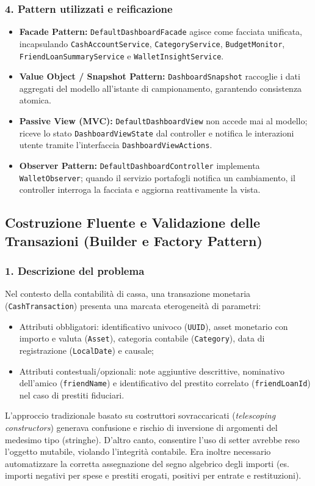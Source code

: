 \documentclass[11pt,a4paper,openright]{report}
\begin{document}
\subsubsection*{4. Pattern utilizzati e reificazione}
\begin{itemize}
  \item \textbf{Facade Pattern:} \texttt{DefaultDashboardFacade} agisce come facciata unificata, incapsulando \texttt{CashAccountService}, \texttt{CategoryService}, \texttt{BudgetMonitor}, \texttt{FriendLoanSummaryService} e \texttt{WalletInsightService}.
  \item \textbf{Value Object / Snapshot Pattern:} \texttt{DashboardSnapshot} raccoglie i dati aggregati del modello all'istante di campionamento, garantendo consistenza atomica.
  \item \textbf{Passive View (MVC):} \texttt{DefaultDashboardView} non accede mai al modello; riceve lo stato \texttt{DashboardViewState} dal controller e notifica le interazioni utente tramite l'interfaccia \texttt{DashboardViewActions}.
  \item \textbf{Observer Pattern:} \texttt{DefaultDashboardController} implementa \texttt{WalletObserver}; quando il servizio portafogli notifica un cambiamento, il controller interroga la facciata e aggiorna reattivamente la vista.
\end{itemize}

\subsection{Costruzione Fluente e Validazione delle Transazioni (Builder e Factory Pattern)}
\subsubsection*{1. Descrizione del problema}
Nel contesto della contabilità di cassa, una transazione monetaria (\texttt{CashTransaction}) presenta una marcata eterogeneità di parametri:
\begin{itemize}
  \item Attributi obbligatori: identificativo univoco (\texttt{UUID}), asset monetario con importo e valuta (\texttt{Asset}), categoria contabile (\texttt{Category}), data di registrazione (\texttt{LocalDate}) e causale;
  \item Attributi contestuali/opzionali: note aggiuntive descrittive, nominativo dell'amico (\texttt{friendName}) e identificativo del prestito correlato (\texttt{friendLoanId}) nel caso di prestiti fiduciari.
\end{itemize}
L'approccio tradizionale basato su costruttori sovraccaricati (\emph{telescoping constructors}) generava confusione e rischio di inversione di argomenti del medesimo tipo (stringhe). D'altro canto, consentire l'uso di setter avrebbe reso l'oggetto mutabile, violando l'integrità contabile. Era inoltre necessario automatizzare la corretta assegnazione del segno algebrico degli importi (es. importi negativi per spese e prestiti erogati, positivi per entrate e restituzioni).
\end{document}
